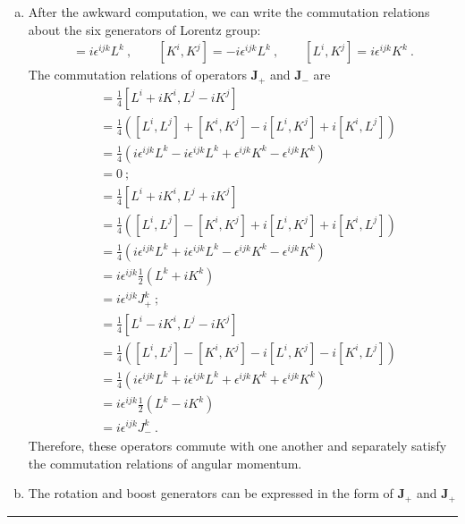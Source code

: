 \documentclass[12pt]{report}
\numberwithin{problemname}{chapter}
\newenvironment{solution}{\vspace{1em}\par\noindent{\large\textbf{\textsc{Solution}}}\par}{\vspace{1em}\hrule}
\begin{document}
\begin{solution}
\begin{enumerate}[(a)]
    \item After the awkward computation, we can write the commutation relations about the six generators of Lorentz group:
    \begin{align}
        [L^i,J^j]=i\epsilon^{ijk}L^k\ ,\quad\quad [K^i,K^j]=-i\epsilon^{ijk}L^k\ ,\quad\quad [L^i,K^j]=i\epsilon^{ijk}K^k\ .
    \end{align}
    The commutation relations of operators $\mathbf{J}_{+}$ and $\mathbf{J}_{-}$ are
    \begin{align}
        [J^i_{+},J^j_{-}]&=\frac{1}{4}[L^i+iK^i,L^j-iK^j] \nonumber \\
        &=\frac{1}{4}([L^i,L^j]+[K^i,K^j]-i[L^i,K^j]+i[K^i,L^j]) \nonumber \\
        &=\frac{1}{4}(i\epsilon^{ijk}L^k-i\epsilon^{ijk}L^k+\epsilon^{ijk}K^k-\epsilon^{ijk}K^k) \nonumber \\
        &=0\ ;
    \end{align}
    \begin{align}
        [J^i_{+},J^j_{+}]&=\frac{1}{4}[L^i+iK^i,L^j+iK^j] \nonumber \\
        &=\frac{1}{4}([L^i,L^j]-[K^i,K^j]+i[L^i,K^j]+i[K^i,L^j]) \nonumber \\
        &=\frac{1}{4}(i\epsilon^{ijk}L^k+i\epsilon^{ijk}L^k-\epsilon^{ijk}K^k-\epsilon^{ijk}K^k) \nonumber \\
        &=i\epsilon^{ijk}\frac{1}{2}(L^k+iK^k) \nonumber \\
        &=i\epsilon^{ijk}J^k_+\ ;
    \end{align}
    \begin{align}
        [J^i_{-},J^j_{-}]&=\frac{1}{4}[L^i-iK^i,L^j-iK^j] \nonumber \\
        &=\frac{1}{4}([L^i,L^j]-[K^i,K^j]-i[L^i,K^j]-i[K^i,L^j]) \nonumber \\
        &=\frac{1}{4}(i\epsilon^{ijk}L^k+i\epsilon^{ijk}L^k+\epsilon^{ijk}K^k+\epsilon^{ijk}K^k) \nonumber \\
        &=i\epsilon^{ijk}\frac{1}{2}(L^k-iK^k) \nonumber \\
        &=i\epsilon^{ijk}J^k_-\ .
    \end{align}
    Therefore, these operators commute with one another and separately satisfy the commutation relations of angular momentum.
    \item The rotation and boost generators can be expressed in the form of $\mathbf{J}_+$ and $\mathbf{J}_+$

\end{enumerate}
\end{solution}
\end{document}
